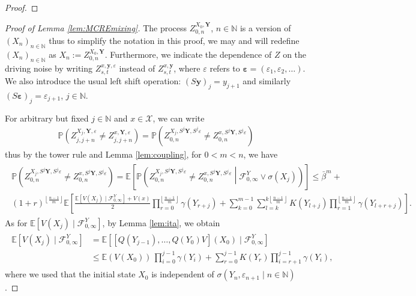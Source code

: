 \documentclass[a4paper,10pt]{article}
\newcommand{\N}{\mathbb{N}}
\newcommand{\F}{\mathcal{F}}
\newcommand{\X}{\mathcal{X}}
\renewcommand{\P}{\mathbb{P}}
\newcommand{\E}{\mathbb{E}}
\newcommand{\eps}{\varepsilon}
\newcommand{\ga}{\gamma}
\newcommand{\lfrf}[1]{\left\lfloor #1\right\rfloor}
\begin{document}
\begin{proof}
\end{proof}

\begin{proof}[Proof of Lemma \ref{lem:MCREmixing}]
The process $Z_{0,n}^{X_0,\mathbf{Y}}$, $n\in\N$ is a version of $(X_n)_{n\in\N}$ thus 
to simplify the notation in this proof, we may and will redefine $(X_n)_{n\in\N}$ as $X_n:=Z_{0,n}^{X_0,\mathbf{Y}}$.
Furthermore, we indicate the dependence of $Z$ on the driving noise by writing $Z_{s,t}^{x,\mathbf{y},\eps}$ instead of $Z_{s,t}^{x,\mathbf{y}}$, where $\eps$ refers to $\mathbf{\eps}=(\eps_1,\eps_2,\ldots)$. We also introduce the usual left shift operation: $(S\mathbf{y})_j=y_{j+1}$ and similarly $(S\mathbf{\eps})_j=\eps_{j+1}$, $j\in\N$.

\medskip
For arbitrary but fixed $j\in\N$ and $x\in\X$, we can write
\begin{align*}
	\P (Z_{j,j+n}^{X_j,\mathbf{Y},\eps}\ne Z_{j,j+n}^{x,\mathbf{Y},\eps}) 
	=
	\P (Z_{0,n}^{X_j,S^j\mathbf{Y},S^j\eps}\ne Z_{0,n}^{x,S^j\mathbf{Y},S^j\eps})
\end{align*} 
thus by the tower rule and Lemma \ref{lem:coupling}, for $0<m<n$, we have
\begin{align}\label{eq:est1}
\begin{split}
\P (Z_{0,n}^{X_j,S^j\mathbf{Y},S^j\eps}\ne Z_{0,n}^{x,S^j\mathbf{Y},S^j\eps}) =
\E \left[\P \left(Z_{0,n}^{X_j,S^j\mathbf{Y},S^j\eps}\ne Z_{0,n}^{x,S^j\mathbf{Y},S^j\eps} \middle| 
\F_{0,\infty}^Y\vee\sigma (X_j)
\right)\right] \le \bar{\beta}^m
+& \\
(1+r)^{\lfrf{\frac{n-1}{m}}}\E\left[
\frac{\E \left[V(X_j)\mid \F_{0,\infty}^Y\right]+V(x)}{2}\prod_{r=0}^{\lfrf{\frac{n-1}{m}}}\ga (Y_{r+j})
+
\sum_{k=0}^{m-1}\sum_{l=k}^{k\lfrf{\frac{n-1}{m}}} K(Y_{l+j})\prod_{r=1}^{\lfrf{\frac{n-1}{m}}}\ga (Y_{l+r+j})
\right].
\end{split}
\end{align}
As for $\E \left[V(X_j)\mid \F_{0,\infty}^Y\right]$, by Lemma \ref{lem:ita}, we obtain
\begin{align}\label{eq:est2}
\begin{split}
\E \left[V(X_j)\mid \F_{0,\infty}^Y\right] &= \E \left[[Q(Y_{j-1}),\ldots, Q(Y_0)V](X_0)\mid \F_{0,\infty}^Y\right]
\\
&\le
	\E(V(X_0))\,\prod_{i=0}^{j-1}
\ga (Y_i)
+ \sum_{r=0}^{j-1}K(Y_r)\prod_{i=r+1}^{j-1}
\ga (Y_i),
\end{split}
\end{align}
where we used that the initial state $X_0$ is independent of $\sigma (Y_n,\eps_{n+1}\mid n\in\N)$. 


\end{proof}
\end{document}
